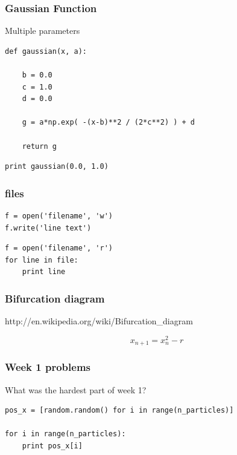 \documentclass{beamer}
\begin{document}
\begin{frame}[fragile]

    \frametitle{Gaussian Function}

    Multiple parameters

    \bigskip

\begin{lstlisting}
def gaussian(x, a):

    b = 0.0
    c = 1.0
    d = 0.0

    g = a*np.exp( -(x-b)**2 / (2*c**2) ) + d

    return g
\end{lstlisting}

\begin{lstlisting}
print gaussian(0.0, 1.0)
\end{lstlisting}

\end{frame}

\begin{frame}[fragile]

    \frametitle{files}

\begin{lstlisting}
f = open('filename', 'w')
f.write('line text')
\end{lstlisting}

\begin{lstlisting}
f = open('filename', 'r')
for line in file:
    print line
\end{lstlisting}

\end{frame}


\begin{frame}[fragile]

    \frametitle{Bifurcation diagram}

    http://en.wikipedia.org/wiki/Bifurcation\_diagram

    \bigskip

    \begin{equation*}
        x_{n+1} = x_n^2 - r
    \end{equation*}

\end{frame}


\begin{frame}[fragile]

    \frametitle{Week 1 problems}

    What was the hardest part of week 1?\\

    \bigskip

\begin{lstlisting}
pos_x = [random.random() for i in range(n_particles)]

for i in range(n_particles):
    print pos_x[i]

\end{lstlisting}


\end{frame}
\end{document}

